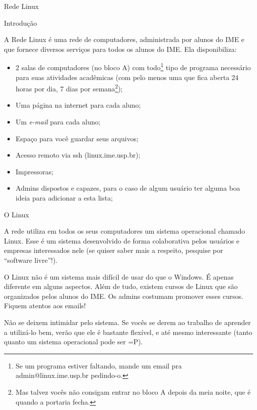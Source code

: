 \begin{subsecao}{Rede Linux}


\begin{subsubsecao}{Introdução}

A Rede Linux é uma rede de computadores, administrada por alunos do IME e
que fornece diversos serviços para todos os alunos do IME.
Ela disponibiliza:

\vspace{-1em}

\begin{itemize}
\item 2 salas de computadores (no bloco A) com todo\footnote{ Se um programa
estiver faltando, mande um email pra admin@linux.ime.usp.br pedindo-o.} tipo de
programa necessário para suas atividades acadêmicas (com pelo menos uma que fica
aberta 24 horas por dia, 7 dias por semana\footnote{ Mas talvez vocês não
consigam entrar no bloco A depois da meia noite, que é quando a portaria
fecha.});
\item Uma página na internet para cada aluno;
\item Um \textit{e-mail} para cada aluno;
\item Espaço para você guardar seus arquivos;
\item Acesso remoto via ssh (linux.ime.usp.br);
\item Impressoras;
\item Admins dispostos e capazes, para o caso de algum usuário ter alguma boa
ideia para adicionar a esta lista;
\end{itemize}
\end{subsubsecao}

\begin{subsubsecao}{O Linux}

A rede utiliza em todos os seus computadores um sistema operacional chamado
Linux. Esse é um sistema desenvolvido de forma colaborativa pelos usuários
e empresas interessados nele (se quiser saber mais a respeito, pesquise
por ``software livre''!).

O Linux não é um sistema mais difícil de usar do que o Windows. É apenas
diferente em alguns aspectos. Além de tudo, existem cursos de Linux que são
organizados pelos alunos do IME. Os admins costumam promover esses cursos.
Fiquem atentos aos emails!

Não se deixem intimidar pelo sistema. Se vocês se derem ao trabalho de
aprender a utilizá-lo bem, verão que ele é bastante flexível, e até mesmo
interessante (tanto quanto um sistema operacional pode ser =P).


\end{subsubsecao}
\end{subsecao}
